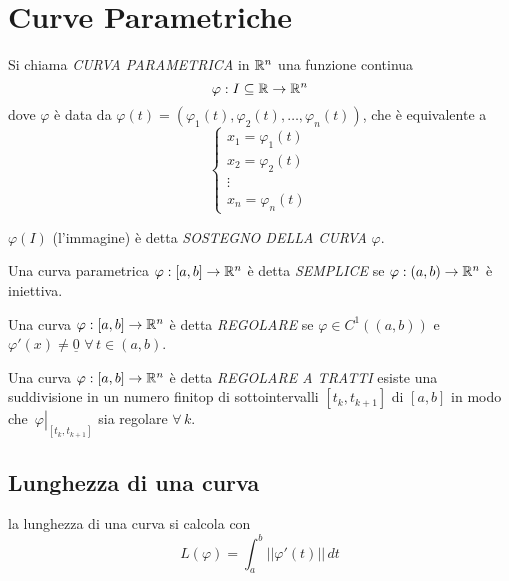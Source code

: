 \section{Curve Parametriche}

\begin{definition}
    Si chiama \emph{CURVA PARAMETRICA} in $\mathbb{R}^n$ una funzione continua 
    \begin{equation}
        \varphi : I \subseteq \mathbb{R} \to \mathbb{R}^n
    \end{equation}
    dove $\varphi$ è data da $\varphi(t) = (\varphi_1(t), \varphi_2(t), \dotsc, \varphi_n(t))$, che è equivalente a 
    \[
        \begin{cases}
            x_1 = \varphi_1(t) \\
            x_2 = \varphi_2(t) \\
            \vdots \\
            x_n = \varphi_n(t)
        \end{cases}
    \]
\end{definition}


$\varphi(I)$ (l'immagine) è detta \emph{SOSTEGNO DELLA CURVA} $\varphi$.

\begin{definition}
    Una curva parametrica $\varphi:[a,b] \to \mathbb{R}^n$ è detta \emph{SEMPLICE} se $\varphi:(a,b) \to \mathbb{R}^n$ è iniettiva.
\end{definition}

\begin{definition}
    Una curva $\varphi:[a,b] \to \mathbb{R}^n$ è detta \emph{REGOLARE} se $\varphi \in C^1((a,b))$ e $\varphi'(x) \neq \underline{0}$ $\forall\, t \in (a, b)$.
\end{definition}

\begin{definition}
    Una curva $\varphi:[a,b] \to \mathbb{R}^n$ è detta \emph{REGOLARE A TRATTI} esiste una suddivisione in un numero finitop di sottointervalli $[t_k, t_{k+1}]$ di $[a,b]$ in modo che$\left.\phantom{\frac{1}{1}}\varphi\right|_{[t_k, t_{k+1}]}$ sia regolare $\forall \, k$.
\end{definition}

\subsection{Lunghezza di una curva}
la lunghezza di una curva si calcola con
\begin{equation}
    L(\varphi) = \int_a^b || \varphi' (t) || \, dt
\end{equation}

